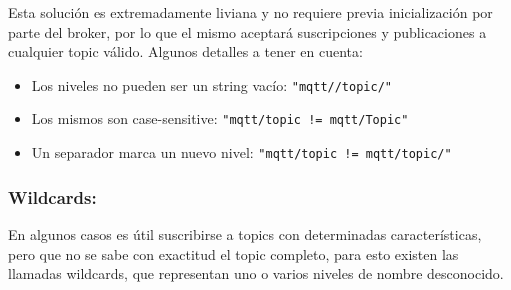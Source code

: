Esta solución es extremadamente liviana y no requiere previa inicialización por parte del broker, por lo que el mismo aceptará suscripciones y publicaciones a cualquier topic válido.
Algunos detalles a tener en cuenta:

\begin{itemize}

\item Los niveles no pueden ser un string vacío:
\lstinline[columns=fixed]{"mqtt//topic/"}
\item Los mismos son case-sensitive:
\lstinline[columns=fixed]{"mqtt/topic != mqtt/Topic"}
 
\item Un separador marca un nuevo nivel:
\lstinline[columns=fixed]{"mqtt/topic != mqtt/topic/"}

\end{itemize}

\subsubsection{Wildcards:}

En algunos casos es útil suscribirse a topics con determinadas características, pero que no se sabe con exactitud el topic completo, para esto existen las llamadas wildcards, que representan uno o varios niveles de nombre desconocido.


